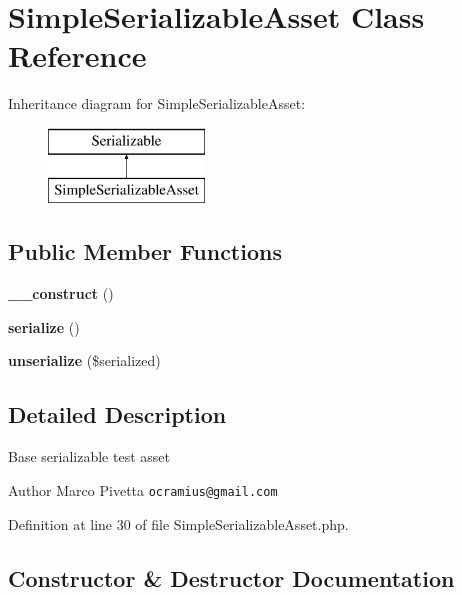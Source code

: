 \section{Simple\+Serializable\+Asset Class Reference}
\label{class_doctrine_test_1_1_instantiator_test_asset_1_1_simple_serializable_asset}
Inheritance diagram for Simple\+Serializable\+Asset\+:\begin{figure}[H]
\begin{center}
\leavevmode
\includegraphics[height=2.000000cm]{class_doctrine_test_1_1_instantiator_test_asset_1_1_simple_serializable_asset}
\end{center}
\end{figure}
\subsection*{Public Member Functions}
\begin{DoxyCompactItemize}
\item 
{\bf \+\_\+\+\_\+construct} ()
\item 
{\bf serialize} ()
\item 
{\bf unserialize} (\$serialized)
\end{DoxyCompactItemize}


\subsection{Detailed Description}
Base serializable test asset

\begin{DoxyAuthor}{Author}
Marco Pivetta {\tt ocramius@gmail.\+com} 
\end{DoxyAuthor}


Definition at line 30 of file Simple\+Serializable\+Asset.\+php.



\subsection{Constructor \& Destructor Documentation}
